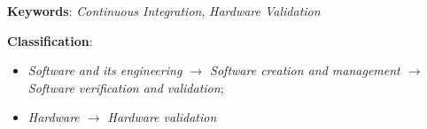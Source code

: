 
\vspace*{10mm}\noindent

\noindent\textbf{Keywords}: \emph{Continuous Integration}, \emph{Hardware Validation}

\vspace*{5mm}\noindent

\noindent\textbf{Classification}: 
\begin{itemize}
\item \emph{Software and its engineering $\rightarrow$ Software creation and management $\rightarrow$ Software verification and validation}; 
\item \emph{Hardware $\rightarrow$ Hardware validation}
\end{itemize}